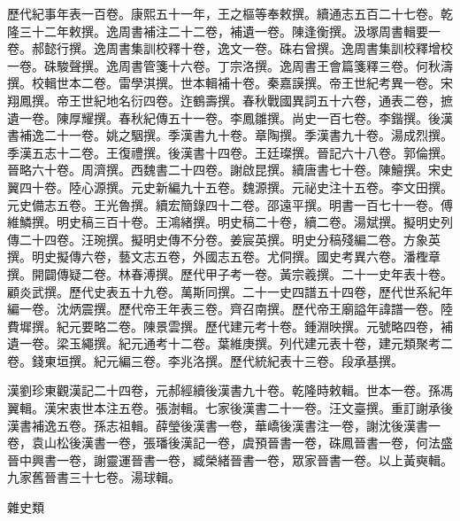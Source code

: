 \begin{pinyinscope}
歷代紀事年表一百卷。康熙五十一年，王之樞等奉敕撰。續通志五百二十七卷。乾隆三十二年敕撰。逸周書補注二十二卷，補遺一卷。陳逢衡撰。汲塚周書輯要一卷。郝懿行撰。逸周書集訓校釋十卷，逸文一卷。硃右曾撰。逸周書集訓校釋增校一卷。硃駿聲撰。逸周書管箋十六卷。丁宗洛撰。逸周書王會篇箋釋三卷。何秋濤撰。校輯世本二卷。雷學淇撰。世本輯補十卷。秦嘉謨撰。帝王世紀考異一卷。宋翔鳳撰。帝王世紀地名衍四卷。迮鶴壽撰。春秋戰國異詞五十六卷，通表二卷，摭遺一卷。陳厚耀撰。春秋紀傳五十一卷。李鳳雛撰。尚史一百七卷。李鍇撰。後漢書補逸二十一卷。姚之駰撰。季漢書九十卷。章陶撰。季漢書九十卷。湯成烈撰。季漢五志十二卷。王復禮撰。後漢書十四卷。王廷璨撰。晉記六十八卷。郭倫撰。晉略六十卷。周濟撰。西魏書二十四卷。謝啟昆撰。續唐書七十卷。陳鱣撰。宋史翼四十卷。陸心源撰。元史新編九十五卷。魏源撰。元祕史注十五卷。李文田撰。元史備志五卷。王光魯撰。續宏簡錄四十二卷。邵遠平撰。明書一百七十一卷。傅維鱗撰。明史稿三百十卷。王鴻緒撰。明史稿二十卷，續二卷。湯斌撰。擬明史列傳二十四卷。汪琬撰。擬明史傳不分卷。姜宸英撰。明史分稿殘編二卷。方象英撰。明史擬傳六卷，藝文志五卷，外國志五卷。尤侗撰。國史考異六卷。潘檉章撰。開闢傳疑二卷。林春溥撰。歷代甲子考一卷。黃宗羲撰。二十一史年表十卷。顧炎武撰。歷代史表五十九卷。萬斯同撰。二十一史四譜五十四卷，歷代世系紀年編一卷。沈炳震撰。歷代帝王年表三卷。齊召南撰。歷代帝王廟謚年諱譜一卷。陸費墀撰。紀元要略二卷。陳景雲撰。歷代建元考十卷。鍾淵映撰。元號略四卷，補遺一卷。梁玉繩撰。紀元通考十二卷。葉維庚撰。列代建元表十卷，建元類聚考二卷。錢東垣撰。紀元編三卷。李兆洛撰。歷代統紀表十三卷。段承基撰。

漢劉珍東觀漢記二十四卷，元郝經續後漢書九十卷。乾隆時敕輯。世本一卷。孫馮翼輯。漢宋衷世本注五卷。張澍輯。七家後漢書二十一卷。汪文臺撰。重訂謝承後漢書補逸五卷。孫志祖輯。薛瑩後漢書一卷，華嶠後漢書注一卷，謝沈後漢書一卷，袁山松後漢書一卷，張璠後漢記一卷，虞預晉書一卷，硃鳳晉書一卷，何法盛晉中興書一卷，謝靈運晉書一卷，臧榮緒晉書一卷，眾家晉書一卷。以上黃奭輯。九家舊晉書三十七卷。湯球輯。

雜史類


\end{pinyinscope}
